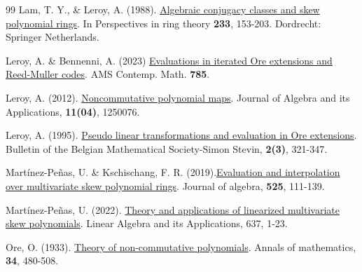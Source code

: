 \documentclass[12pt,a4paper]{article}
\begin{document}
\begin{thebibliography}{99}
	 Lam, T. Y., \& Leroy, A. (1988). {\href{https://doi.org/10.1007/978-94-009-2985-2_15}{Algebraic conjugacy classes and skew polynomial rings}}. In Perspectives in ring theory {\bf  233}, 153-203. Dordrecht: Springer Netherlands.
	 
	 
	 Leroy, A. \& Bennenni, A. (2023) {\href{https://doi.org/10.1090/conm/785}{Evaluations in iterated Ore extensions and Reed-Muller codes}}. AMS Contemp. Math. {\bf 785}.
   
     Leroy, A. (2012).  {\href{https://doi.org/10.1142/S0219498812500764}{Noncommutative polynomial maps}}. Journal of Algebra and its Applications, {\bf 11(04)}, 1250076.
		
	 Leroy, A. (1995).  {\href{https://doi.org/10.1142/S0219498812500764}{Pseudo linear transformations and evaluation in Ore extensions}}. Bulletin of the Belgian Mathematical Society-Simon Stevin, {\bf 2(3)}, 321-347.
	
  
	 Martínez-Peñas, U. \& Kschischang, F. R. (2019).{\href{https://doi.org/10.1016/j.jalgebra.2018.12.032}{Evaluation and interpolation over multivariate skew polynomial rings}}. Journal of algebra, {\bf 525}, 111-139.
	
	 Martínez-Peñas, U. (2022). {\href{https://doi.org/10.1016/j.laa.2021.12.002} {Theory and applications of linearized multivariate skew polynomials}}. Linear Algebra and its Applications, 637, 1-23.
		
	 Ore, O. (1933). {\href{https://doi.org/10.2307/1968173}{Theory of non-commutative polynomials}}. Annals of mathematics, {\bf 34}, 480-508.
		
		
	\end{thebibliography}
	
\end{document}
